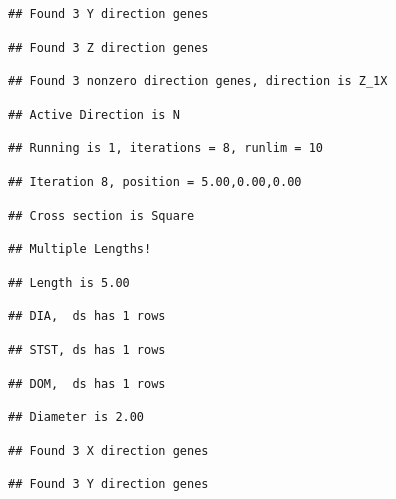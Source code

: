 \documentclass[]{article}
\begin{document}
\begin{verbatim}
## Found 3 Y direction genes
\end{verbatim}

\begin{verbatim}
## Found 3 Z direction genes
\end{verbatim}

\begin{verbatim}
## Found 3 nonzero direction genes, direction is Z_1X
\end{verbatim}

\begin{verbatim}
## Active Direction is N
\end{verbatim}

\begin{verbatim}
## Running is 1, iterations = 8, runlim = 10
\end{verbatim}

\begin{verbatim}
## Iteration 8, position = 5.00,0.00,0.00
\end{verbatim}

\begin{verbatim}
## Cross section is Square
\end{verbatim}

\begin{verbatim}
## Multiple Lengths!
\end{verbatim}

\begin{verbatim}
## Length is 5.00
\end{verbatim}

\begin{verbatim}
## DIA,  ds has 1 rows
\end{verbatim}

\begin{verbatim}
## STST, ds has 1 rows
\end{verbatim}

\begin{verbatim}
## DOM,  ds has 1 rows
\end{verbatim}

\begin{verbatim}
## Diameter is 2.00
\end{verbatim}

\begin{verbatim}
## Found 3 X direction genes
\end{verbatim}

\begin{verbatim}
## Found 3 Y direction genes
\end{verbatim}
\end{document}
